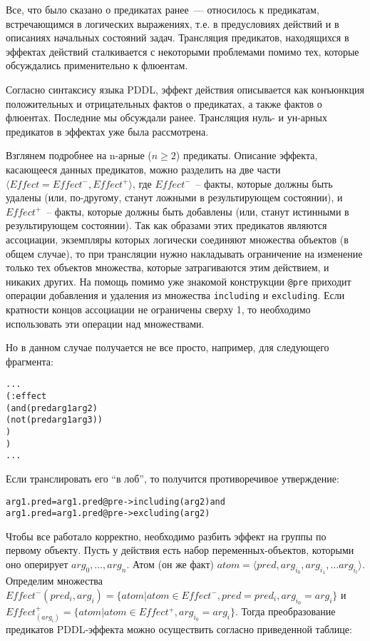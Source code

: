 
Все, что было сказано о предикатах ранее~--- относилось к предикатам, встречающимся в логических выражениях, т.е. в предусловиях действий и в описаниях начальных состояний задач. Трансляция предикатов, находящихся в эффектах действий сталкивается с некоторыми проблемами помимо тех, которые обсуждались применительно к флюентам.

Согласно синтаксису языка PDDL, эффект действия описывается как конъюнкция положительных и отрицательных фактов о предикатах, а также фактов о флюентах. Последние мы обсуждали ранее.
Трансляция нуль- и ун-арных предикатов в эффектах уже была рассмотрена. 

Взглянем подробнее на n-арные ($n \geq 2$) предикаты. Описание эффекта, касающееся данных предикатов, можно разделить на две части $\langle Effect = Effect^-, Effect^+ \rangle$, где $Effect^-$~-- факты, которые должны быть удалены (или, по-другому, станут ложными в результирующем состоянии), и $Effect^+$~-- факты, которые должны быть добавлены (или, станут истинными в результирующем состоянии). Так как образами этих предикатов являются ассоциации, экземпляры которых логически соединяют множества объектов (в общем случае), то при трансляции нужно накладывать ограничение на изменение только тех объектов множества, которые затрагиваются этим действием, и никаких других. На помощь помимо уже знакомой конструкции \texttt{@pre} приходит операции добавления и удаления из множества \texttt{including} и \texttt{excluding}. Если кратности концов ассоциации не ограничены сверху 1, то необходимо использовать эти операции над множествами.

Но в данном случае получается не все просто, например, для следующего фрагмента:

\begin{mdframed}[style=excode]
\begin{alltt}
  ...
  (:effect
    (and (pred arg1 arg2)
         (not (pred arg1 arg3))
    )
  )
  ...
\end{alltt}
\end{mdframed}

Если транслировать его ``в лоб'', то получится противоречивое утверждение:

\begin{alltt}
  arg1.pred = arg1.pred@pre->including(arg2) and
  arg1.pred = arg1.pred@pre->excluding(arg2)
\end{alltt}

Чтобы все работало корректно, необходимо разбить эффект на группы по первому объекту.
Пусть у действия есть набор переменных-объектов, которыми оно оперирует $arg_0, \ldots, arg_n$.
Атом (он же факт) $atom = \langle pred, arg_{i_0}, arg_{i_1}, \ldots arg_{i_l} \rangle$.
Определим множества $Effect^-(pred_i, arg_i) = \{ atom | atom \in Effect^-, pred = pred_i, arg_{i_0} = arg_i \}$ и 
$Effect^+_(arg_i) = \{ atom | atom \in Effect^+,  arg_{i_0} = arg_i \}$. Тогда преобразование предикатов PDDL-эффекта можно осуществить согласно приведенной таблице:
\\

